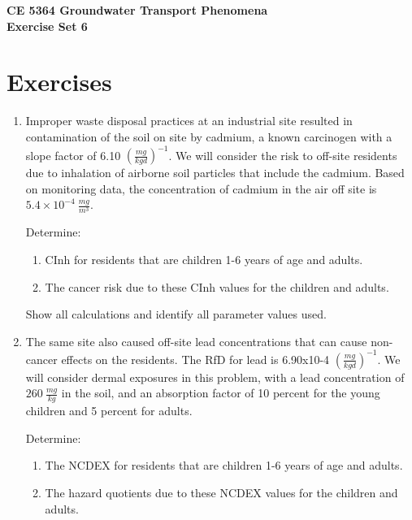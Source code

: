 \documentclass[12pt]{article}
\begin{document}
\begin{center}
{\textbf{{ CE 5364 Groundwater Transport Phenomena } \\ {Exercise Set 6}}}
\end{center}

\section*{\small{Exercises}}
\begin{enumerate} %


\item Improper waste disposal practices at an industrial site resulted in contamination of the soil on site by cadmium, a known carcinogen with a slope factor of 6.10 $(\frac{mg}{kg d})^{-1}$. We will consider the risk to off-site residents due to inhalation of airborne soil particles that include the cadmium.  Based on monitoring data, the concentration of cadmium in the air off site is $5.4 \times 10^{-4}~\frac{mg}{m^3}$.

Determine:

\begin{enumerate} %
\item CInh for residents that are children 1-6 years of age and adults.
\item The cancer risk due to these CInh values for the children and adults. 
\end{enumerate} %

Show all calculations and identify all parameter values used.


\item The same site also caused off-site lead concentrations that can cause non-cancer effects on the residents. The RfD for lead is 6.90x10-4 $(\frac{mg}{kg d})^{-1}$.  We will consider dermal exposures in this problem, with a lead concentration of $260~\frac{mg}{kg}$ in the soil, and an absorption factor of 10 percent for the young children and 5 percent for adults. 

Determine:

\begin{enumerate} %
\item The NCDEX for residents that are children 1-6 years of age and adults. 
\item The hazard quotients due to these NCDEX values for the children and adults.
\end{enumerate} %


\end{enumerate}
\end{document}
